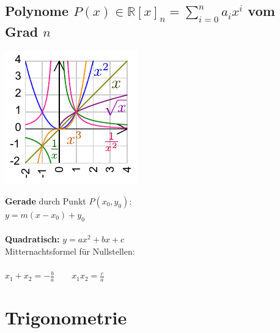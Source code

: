 \documentclass[german]{latex4ei/latex4ei_sheet}
\begin{document}
\begin{sectionbox}
	\subsection{Polynome $P(x)\in\mathbb R[x]_n = \sum\limits_{i=0}^n a_ix^i$ vom Grad $n$}
	\vspace{-0.5em}
	\parbox{3cm}{ \includegraphics[scale = 0.8]{./img/polynome.pdf}}
	\parbox{3.5cm}{ \textbf{Gerade} durch Punkt $P(x_0,y_0)$:\\[0.2em] $y = m(x - x_0) + y_0$ \\
	\\
	\textbf{Quadratisch:} $y = ax^2+bx+c$\\[0.2em]
	Mitternachtsformel für Nullstellen:\\
	\\
	$x_1 + x_2 = - \frac{b}{a} \qquad x_1 x_2 = \frac{c}{a}$
	}
\end{sectionbox}




\section{Trigonometrie}
\end{document}
